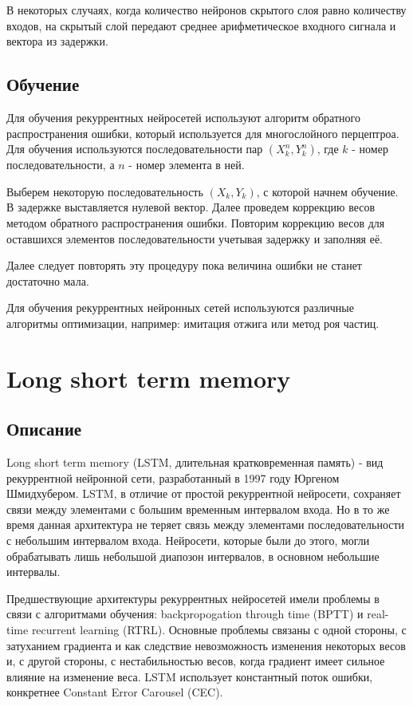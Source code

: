 \documentclass[14pt]{article}
\begin{document}
В некоторых случаях, когда количество нейронов скрытого слоя равно количеству входов, на скрытый слой передают среднее арифметическое входного сигнала и вектора из задержки.
\subsection{Обучение}
Для обучения рекуррентных нейросетей используют алгоритм обратного распространения ошибки, который используется для многослойного перцептроа. Для обучения используются последовательности пар $(X_k^n, Y_k^n)$, где $k$ - номер последовательности, а $n$ - номер элемента в ней.


Выберем некоторую последовательность $(X_k, Y_k)$, с которой начнем обучение. В задержке выставляется нулевой вектор. Далее проведем коррекцию весов методом обратного распространения ошибки. Повторим коррекцию весов для оставшихся элементов последовательности учетывая задержку и заполняя её.


Далее следует повторять эту процедуру пока величина ошибки не станет достаточно мала.


Для обучения рекуррентных нейронных сетей используются различные алгоритмы оптимизации, например: имитация отжига или метод роя частиц.

\section{Long short term memory}

\subsection{Описание}
Long short term memory (LSTM, длительная кратковременная память) - вид рекуррентной нейронной сети, разработанный в 1997 году Юргеном Шмидхубером. LSTM, в отличие от простой рекуррентной нейросети, сохраняет связи между элементами с большим временным интервалом входа. Но в то же время данная архитектура не теряет связь между элементами последовательности с небольшим интервалом входа. Нейросети, которые были до этого, могли обрабатывать лишь небольшой диапозон интервалов, в основном небольшие интервалы.


Предшествующие архитектуры рекуррентных нейросетей имели проблемы в связи с алгоритмами обучения: backpropogation through time (BPTT) и real-time recurrent learning (RTRL). Основные проблемы связаны с одной стороны, с затуханием градиента и как следствие невозможность изменения некоторых весов и, с другой стороны, с нестабильностью весов, когда градиент имеет сильное влияние на изменение веса. LSTM использует константный поток ошибки, конкретнее Constant Error Carousel (CEC).
\end{document}
